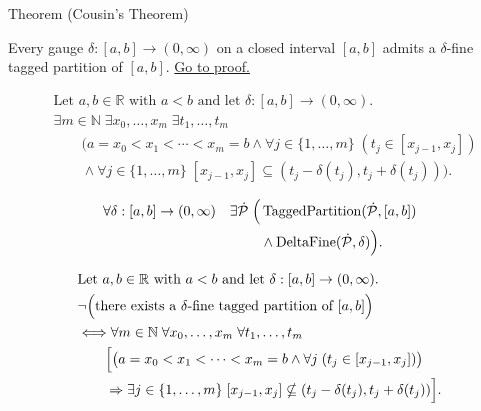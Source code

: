 
\begin{theorembox}{Theorem (Cousin's Theorem)}
\begin{theorem}
\label{thm:cousins-theorem}
Every gauge $\delta:[a,b]\to(0,\infty)$ on a closed interval $[a,b]$
admits a $\delta$-fine tagged partition of $[a,b]$.
\hyperref[prf:cousins-theorem]{Go to proof.}
\end{theorem}
\end{theorembox}

\begin{remark*}
\[
\begin{aligned}
&\text{Let } a,b \in \mathbb{R} \text{ with } a < b \text{ and let } \delta:[a,b]\to(0,\infty).\\
&\exists m \in \mathbb{N}\;\exists x_0,\ldots,x_m\;\exists t_1,\ldots,t_m\\
&\qquad\bigl(a=x_0<x_1<\cdots<x_m=b
\land \forall j\in\{1,\ldots,m\}\;(t_j\in[x_{j-1},x_j])\\
&\qquad\land
\forall j\in\{1,\ldots,m\}\;[x_{j-1},x_j]\subseteq
(t_j-\delta(t_j),t_j+\delta(t_j))\bigr).
\end{aligned}
\]
\end{remark*}

\begin{remark*}
\[
\begin{aligned}
\forall \delta:[a,b]\to(0,\infty)\quad
\exists \dot{\mathcal{P}}\;\Bigl(
&\operatorname{TaggedPartition}(\dot{\mathcal{P}},[a,b])\\
&\land
\operatorname{DeltaFine}(\dot{\mathcal{P}},\delta)
\Bigr).
\end{aligned}
\]
\end{remark*}

\begin{remark*}
\[
\begin{aligned}
&\text{Let } a,b \in \mathbb{R} \text{ with } a < b \text{ and let } \delta:[a,b]\to(0,\infty).\\
&\neg\Bigl(\text{there exists a }\delta\text{-fine tagged partition of }[a,b]\Bigr)\\
&\Longleftrightarrow
\forall m \in \mathbb{N}\;\forall x_0,\ldots,x_m\;\forall t_1,\ldots,t_m\\
&\qquad\Bigl[
\bigl(a=x_0<x_1<\cdots<x_m=b
\land \forall j\;(t_j\in[x_{j-1},x_j])\bigr)\\
&\qquad\Rightarrow
\exists j\in\{1,\ldots,m\}\;
[x_{j-1},x_j]\nsubseteq(t_j-\delta(t_j),t_j+\delta(t_j))
\Bigr].
\end{aligned}
\]
\end{remark*}

